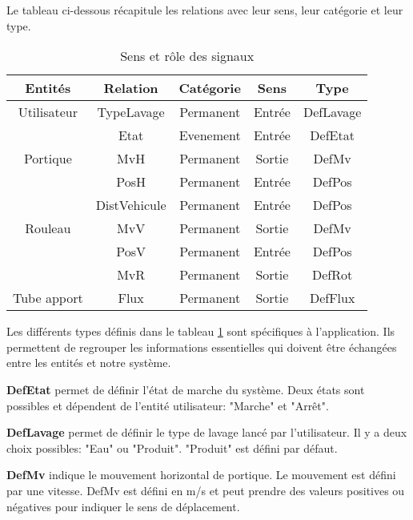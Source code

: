 Le tableau ci-dessous récapitule les relations avec leur sens, leur catégorie et leur type.

\begin{table}[H]
	\centering
	\begin{tabular}{|c|c|c|c|c|}
		\hline
		Entités                       & Relation  	  & Catégorie    & Sens   	& Type       \\
		\hline
		Utilisateur                   & TypeLavage    & Permanent    & Entrée   & DefLavage  \\
									  & Etat    	  & Evenement    & Entrée   & DefEtat \\
		\hline
		Portique                      & MvH  		  & Permanent    & Sortie   & DefMv      \\
									  & PosH  		  & Permanent    & Entrée   & DefPos     \\
									  & DistVehicule  & Permanent    & Entrée   & DefPos   	 \\
		\hline
		Rouleau                       & MvV  		  & Permanent    & Sortie   & DefMv      \\
									  & PosV  		  & Permanent    & Entrée   & DefPos     \\
									  & MvR  		  & Permanent    & Sortie   & DefRot     \\
    	\hline
		Tube apport                   & Flux  		  & Permanent    & Sortie   & DefFlux    \\
		\hline
	\end{tabular}
	\caption{Sens et rôle des signaux}
	\label{tab:entrees_sorties_composant}
\end{table}

Les différents types définis dans le tableau \ref{tab:entrees_sorties_composant} sont spécifiques à l'application.
Ils permettent de regrouper les informations essentielles qui doivent être échangées entre les entités et notre système.

\textbf{DefEtat} permet de définir l'état de marche du système.
Deux états sont possibles et dépendent de l'entité utilisateur: "Marche" et "Arrêt".

\textbf{DefLavage} permet de définir le type de lavage lancé par l'utilisateur.
Il y a deux choix possibles: "Eau" ou "Produit". 
"Produit" est défini par défaut.

\textbf{DefMv} indique le mouvement horizontal de portique.
Le mouvement est défini par une vitesse.
DefMv est défini en m/s et peut prendre des valeurs positives ou négatives pour indiquer le sens de déplacement. 

